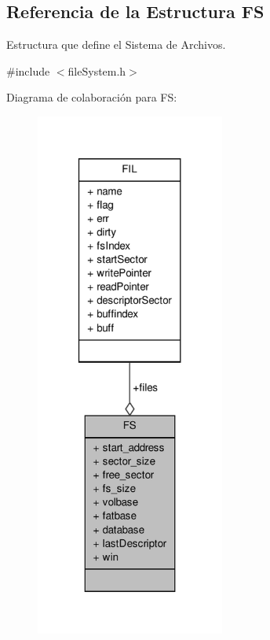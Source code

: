 \hypertarget{structFS}{\subsection{Referencia de la Estructura F\+S}
\label{structFS}
}


Estructura que define el Sistema de Archivos.  




{\ttfamily \#include $<$file\+System.\+h$>$}



Diagrama de colaboración para F\+S\+:\nopagebreak
\begin{figure}[H]
\begin{center}
\leavevmode
\includegraphics[width=176pt]{structFS__coll__graph}
\end{center}
\end{figure}
